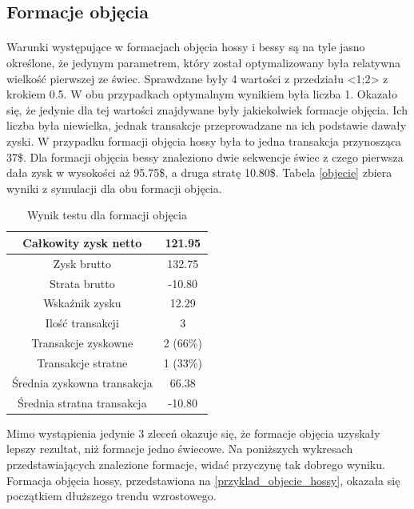 \documentclass[pdflatex,11pt]{aghdpl}
\begin{document}
\subsection{Formacje objęcia}
\paragraph{}

Warunki występujące w formacjach objęcia hossy i bessy są na tyle jasno określone, że jedynym parametrem, który został optymalizowany była relatywna wielkość pierwszej ze świec. Sprawdzane były 4 wartości z przedziału <1;2> z krokiem 0.5. W obu przypadkach optymalnym wynikiem była liczba 1. Okazało się, że jedynie dla tej wartości znajdywane były jakiekolwiek formacje objęcia. Ich liczba była niewielka, jednak transakcje przeprowadzane na ich podstawie dawały zyski. W przypadku formacji objęcia hossy była to jedna transakcja przynosząca 37\$. Dla formacji objęcia bessy znaleziono dwie sekwencje świec z czego pierwsza dała zysk w wysokości aż 95.75\$, a druga stratę 10.80\$. Tabela \ref{objecie} zbiera wyniki z symulacji dla obu formacji objęcia.
\begin{table}[h!]
\begin{center}
\begin{tabular}{|c|c|}
\hline 
Całkowity zysk netto & 121.95\\
\hline
Zysk brutto & 132.75 \\
\hline
Strata brutto & -10.80 \\
\hline
Wskaźnik zysku & 12.29 \\
\hline
\hline
Ilość transakcji & 3 \\
\hline
Transakcje zyskowne & 2 (66\%) \\
\hline
Transakcje stratne & 1 (33\%) \\
\hline
\hline
Średnia zyskowna transakcja & 66.38 \\
\hline
Średnia stratna transakcja & -10.80 \\
\hline
\end{tabular} 
\caption{Wynik testu dla formacji objęcia}
\label{raport_objecie}
\end{center}
\end{table}
Mimo wystąpienia jedynie 3 zleceń okazuje się, że formacje objęcia uzyskały lepszy rezultat, niż formacje jedno świecowe. Na poniższych wykresach przedstawiających znalezione formacje, widać przyczynę tak dobrego wyniku. Formacja objęcia hossy, przedstawiona na \ref{przyklad_objecie_hossy}, okazała się początkiem dłuższego trendu wzrostowego. 
\end{document}
